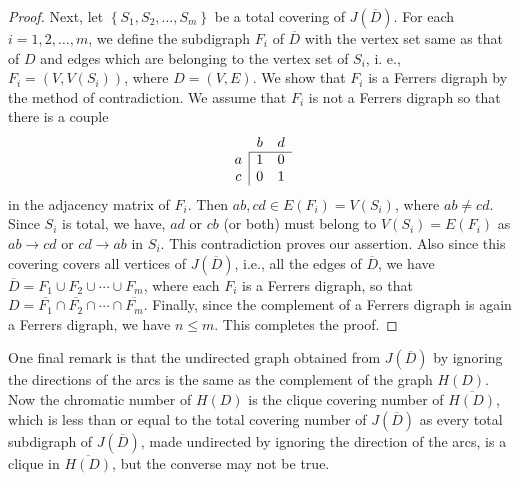 \documentclass[11pt]{article}
\theoremstyle{definition}
\theoremstyle{remark}
\numberwithin{equation}{section}
\begin{document}
\begin{proof}
\vspace{1em}Next, let $\left\{ S_1, S_2, \ldots, S_m\right\}$ be a total covering of $J(\overline D)$. For each $i = 1, 2, \ldots, m$, we define the subdigraph $F_i$ of $\overline D$ with the vertex set same as that of $D$ and edges which are belonging to the vertex set of $S_i$, i. e., $F_i = (V, V(S_i))$, where $D = (V, E)$. We show that $F_i$ is a Ferrers digraph by the method of contradiction. We assume that $F_i$ is not a Ferrers digraph so that there is a couple
$$\begin{array}{c|cc}
\multicolumn{1}{c}{} & b & d \\ \cline{2-3}
a & 1 & 0 \\
c & 0 & 1
\end{array}$$
in the adjacency matrix of $F_i$. Then $ab, cd \in E(F_i) = V(S_i)$, where $ab \neq cd$. Since $S_i$ is total, we have, $ad$ or $cb$ (or both) must belong to $V(S_i) = E(F_i)$ as $ab \rightarrow cd$ or $cd \rightarrow ab$ in $S_i$. This contradiction proves our assertion. Also since this covering covers all vertices of $J(\overline D)$, i.e., all the edges of $\overline D$, we have $\overline D = F_1 \cup F_2 \cup \cdots \cup F_m$, where each $F_i$ is a Ferrers digraph, so that $D = \overline{F_1} \cap \overline{F_2} \cap \cdots \cap \overline{F_m}$. Finally, since the complement of a Ferrers digraph is again a Ferrers digraph, we have $n \leq m$. This completes the proof.
\end{proof} 

One final remark is that the undirected graph obtained from $J(\overline D)$ by ignoring the directions of the arcs is the same as the complement of the graph $H(D)$. Now the chromatic number of $H(D)$ is the clique covering number of $\overline {H(D)}$, which is less than or equal to the total covering number of $J(\overline D)$ as every total subdigraph of $J(\overline D)$, made undirected by ignoring the direction of the arcs, is a clique in $\overline{H(D)}$, but the converse may not be true.
\end{document}
